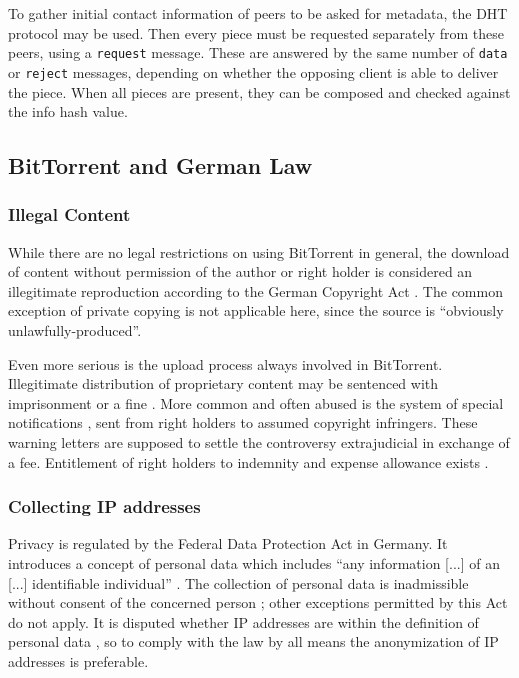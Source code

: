 \documentclass[10pt, a4paper, twoside]{scrartcl}
\renewcommand{\_}{\origunderscore\allowbreak}
\begin{document}
To gather initial contact information of peers to be asked for metadata, the DHT protocol may be used. Then every piece must be requested separately from these peers, using a \texttt{request} message. These are answered by the same number of \texttt{data} or \texttt{reject} messages, depending on whether the opposing client is able to deliver the piece. When all pieces are present, they can be composed and checked against the info hash value.

\subsection{BitTorrent and German Law}
\subsubsection{Illegal Content}
While there are no legal restrictions on using BitTorrent in general, the download of content without permission of the author or right holder is considered an illegitimate reproduction according to the German Copyright Act \cite[art.~15\,(1),~16]{urhg}. The common exception of private copying \cite[art.~53]{urhg} is not applicable here, since the source is ``obviously unlawfully-produced''.

Even more serious is the upload process always involved in BitTorrent. Illegitimate distribution of proprietary content may be sentenced with imprisonment or a fine \cite[art.~106]{urhg}. More common and often abused \cite{abmahnung} is the system of special notifications \cite[art.~97a]{urhg}, sent from right holders to assumed copyright infringers. These warning letters are supposed to settle the controversy extrajudicial in exchange of a fee. Entitlement of right holders to indemnity and expense allowance exists \cite[art.~97]{urhg}.

\subsubsection{Collecting IP addresses}
Privacy is regulated by the Federal Data Protection Act \cite{bdsg} in Germany. It introduces a concept of personal data which includes ``any information [...] of an [...] identifiable individual'' \cite[sec.~3\,(1)]{bdsg}. The collection of personal data is inadmissible without consent of the concerned person \cite[sec.~4]{bdsg}; other exceptions permitted by this Act do not apply. It is disputed whether IP addresses are within the definition of personal data \cite{ip}, so to comply with the law by all means the anonymization of IP addresses is preferable.
\cleardoublepage
\end{document}

